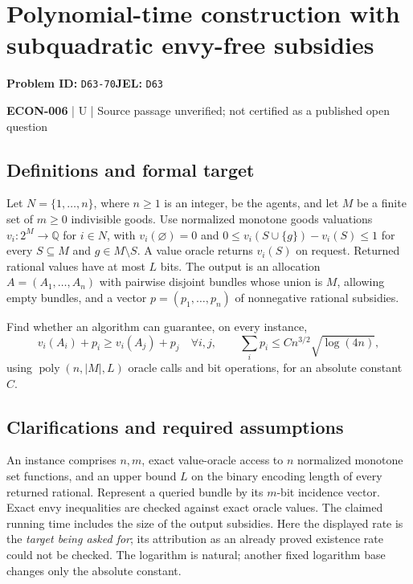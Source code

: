 \documentclass[11pt,a4paper]{article}
\begin{document}
\section*{Polynomial-time construction with subquadratic envy-free subsidies}
\textbf{Problem ID:} \texttt{D63-70}\quad \textbf{JEL:} \texttt{D63}\par
\label{problem:OP-0593}


\label{audited:ECON-006}

{\sffamily\small\color{muted}\textbf{ECON-006} | U | Source passage unverified; not certified as a published open question\par}

\subsection*{Definitions and formal target}

Let $N=\{1,\ldots,n\}$, where $n\geq1$ is an integer, be the agents, and let $M$ be a finite set of $m\geq0$ indivisible goods. Use normalized monotone goods valuations $v_i:2^M\to\mathbb Q$ for $i\in N$, with $v_i(\varnothing)=0$ and $0\leq v_i(S\cup\{g\})-v_i(S)\leq1$ for every $S\subseteq M$ and $g\in M\setminus S$. A value oracle returns $v_i(S)$ on request. Returned rational values have at most $L$ bits. The output is an allocation $A=(A_1,\ldots,A_n)$ with pairwise disjoint bundles whose union is $M$, allowing empty bundles, and a vector $p=(p_1,\ldots,p_n)$ of nonnegative rational subsidies.

Find whether an algorithm can guarantee, on every instance,
\[
 v_i(A_i)+p_i\geq v_i(A_j)+p_j\quad\forall i,j,
 \qquad \sum_i p_i\leq C n^{3/2}\sqrt{\log(4n)},
\]
using $\operatorname{poly}(n,|M|,L)$ oracle calls and bit operations, for an absolute constant $C$.

\subsection*{Clarifications and required assumptions}

An instance comprises $n,m$, exact value-oracle access to $n$ normalized monotone set functions, and an upper bound $L$ on the binary encoding length of every returned rational. Represent a queried bundle by its $m$-bit incidence vector. Exact envy inequalities are checked against exact oracle values. The claimed running time includes the size of the output subsidies. Here the displayed rate is the \emph{target being asked for}; its attribution as an already proved existence rate could not be checked. The logarithm is natural; another fixed logarithm base changes only the absolute constant.
\end{document}
